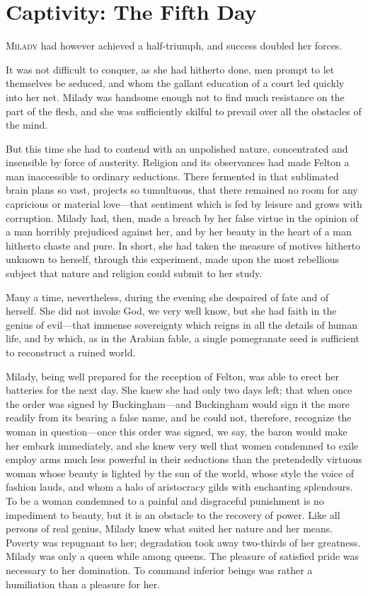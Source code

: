 
\chapter{Captivity: The Fifth Day}

\lettrine{M}{ilady} had however achieved a half-triumph, and success doubled her forces. 

\zz
It was not difficult to conquer, as she had hitherto done, men prompt to let themselves be seduced, and whom the gallant education of a court led quickly into her net. Milady was handsome enough not to find much resistance on the part of the flesh, and she was sufficiently skilful to prevail over all the obstacles of the mind. 

But this time she had to contend with an unpolished nature, concentrated and insensible by force of austerity. Religion and its observances had made Felton a man inaccessible to ordinary seductions. There fermented in that sublimated brain plans so vast, projects so tumultuous, that there remained no room for any capricious or material love—that sentiment which is fed by leisure and grows with corruption. Milady had, then, made a breach by her false virtue in the opinion of a man horribly prejudiced against her, and by her beauty in the heart of a man hitherto chaste and pure. In short, she had taken the measure of motives hitherto unknown to herself, through this experiment, made upon the most rebellious subject that nature and religion could submit to her study. 

Many a time, nevertheless, during the evening she despaired of fate and of herself. She did not invoke God, we very well know, but she had faith in the genius of evil—that immense sovereignty which reigns in all the details of human life, and by which, as in the Arabian fable, a single pomegranate seed is sufficient to reconstruct a ruined world. 

Milady, being well prepared for the reception of Felton, was able to erect her batteries for the next day. She knew she had only two days left; that when once the order was signed by Buckingham—and Buckingham would sign it the more readily from its bearing a false name, and he could not, therefore, recognize the woman in question—once this order was signed, we say, the baron would make her embark immediately, and she knew very well that women condemned to exile employ arms much less powerful in their seductions than the pretendedly virtuous woman whose beauty is lighted by the sun of the world, whose style the voice of fashion lauds, and whom a halo of aristocracy gilds with enchanting splendours. To be a woman condemned to a painful and disgraceful punishment is no impediment to beauty, but it is an obstacle to the recovery of power. Like all persons of real genius, Milady knew what suited her nature and her means. Poverty was repugnant to her; degradation took away two-thirds of her greatness. Milady was only a queen while among queens. The pleasure of satisfied pride was necessary to her domination. To command inferior beings was rather a humiliation than a pleasure for her. 

